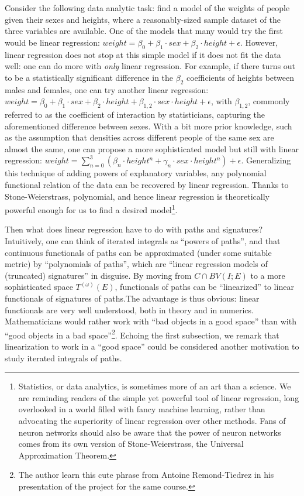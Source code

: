 \documentclass[fleqn]{article}
\theoremstyle{definition}
\theoremstyle{remark}
\begin{document}
\par
Consider the following data analytic task: find a model of the weights of people given their sexes and heights, where a reasonably-sized sample dataset of the three variables are available. One of the models that many would try the first would be linear regression: $weight = \beta_0 + \beta_1\cdot sex + \beta_2\cdot height + \epsilon$. However, linear regression does not stop at this simple model if it does not fit the data well: one can do more with \emph{only} linear regression. For example, if there turns out to be a statistically significant difference in the $\beta_2$ coefficients of heights between males and females, one can try another linear regression: $weight = \beta_0 + \beta_1\cdot sex + \beta_2\cdot height + \beta_{1,2}\cdot sex\cdot height + \epsilon$, with $\beta_{1,2}$, commonly referred to as the coefficient of interaction by statisticians, capturing the aforementioned difference between sexes. With a bit more prior knowledge, such as the assumption that densities across different people of the same sex are almost the same, one can propose a more sophisticated model but still with linear regression: $weight = \sum_{n=0}^3\left(\beta_n\cdot height^n + \gamma_n\cdot sex\cdot height^n\right) + \epsilon$. Generalizing this technique of adding powers of explanatory variables, any polynomial functional relation of the data can be recovered by linear regression. Thanks to Stone-Weierstrass, polynomial, and hence linear regression is theoretically powerful enough for us to find a desired model\footnote{Statistics, or data analytics, is sometimes more of an art than a science. We are reminding readers of the simple yet powerful tool of linear regression, long overlooked in a world filled with fancy machine learning, rather than advocating the superiority of linear regression over other methods. Fans of neuron networks should also be aware that the power of neuron networks comes from its own version of Stone-Weierstrass, the Universal Approximation Theorem.}.

\par
Then what does linear regression have to do with paths and signatures? Intuitively, one can think of iterated integrals as ``powers of paths'', and that continuous functionals of paths can be approximated (under some suitable metric) by ``polynomials of paths'', which are ``linear regression models of (truncated) signatures'' in disguise. By moving from $C\cap BV(I;E)$ to a more sophisticated space $T^{(\omega)}(E)$, functionals of paths can be ``linearized'' to linear functionals of signatures of paths.The advantage is thus obvious: linear functionals are very well understood, both in theory and in numerics. Mathematicians would rather work with ``bad objects in a good space'' than with ``good objects in a bad space''\footnote{The author learn this cute phrase from Antoine Remond-Tiedrez in his presentation of the project for the same course.}. Echoing the first subsection, we remark that linearization to work in a ``good space'' could be considered another motivation to study iterated integrals of paths.
\end{document}
